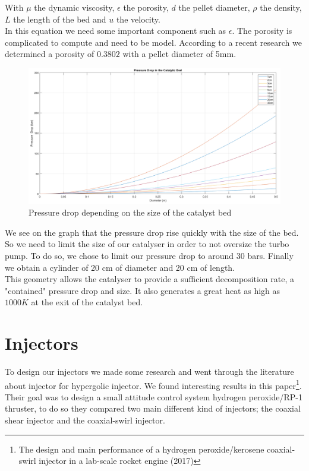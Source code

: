 With $\mu$ the dynamic viscosity, $\epsilon$ the porosity, $d$ the pellet diameter, $\rho$ the density, $L$ the length of the bed and $u$ the velocity. \\

In this equation we need some important component such as $\epsilon$. The porosity is complicated to compute and need to be model. According to a recent research we determined a porosity of $0.3802$ with a pellet diameter of 5mm.

\begin{figure}[H]
	\centering
	\includegraphics[width=\linewidth]{pressuredrop}
	\caption{Pressure drop depending on the size of the catalyst bed}
\end{figure}

We see on the graph that the pressure drop rise quickly with the size of the bed. So we need to limit the size of our catalyser in order to not oversize the turbo pump. To do so, we chose to limit our pressure drop to around 30 bars. Finally we obtain a cylinder of 20 cm of diameter and 20 cm of length. \\

This geometry allows the catalyser to provide a sufficient decomposition rate, a "contained" pressure drop and size. It also generates a great heat as high as $1000K$ at the exit of the catalyst bed. 

\section{Injectors}

To design our injectors we made some research and went through the literature about injector for hypergolic injector. We found interesting results in this paper\footnote{The design and main performance of a hydrogen peroxide/kerosene coaxial-swirl injector in a lab-scale rocket engine (2017)}. Their goal was to design a small attitude control system hydrogen peroxide/RP-1 thruster, to do so they compared two main different kind of injectors; the coaxial shear injector and the coaxial-swirl injector. \\

